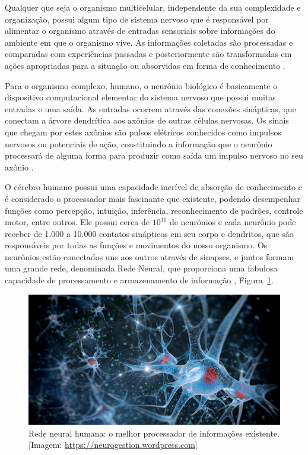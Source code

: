 Qualquer que seja o organismo multicelular, independente da sua complexidade e organização, possui algum tipo de sistema nervoso que é responsável por alimentar o organismo através de entradas sensoriais sobre informações do ambiente em que o organismo vive. As informações coletadas são processadas e comparadas com experiências passadas e posteriormente são transformadas em ações apropriadas para a situação ou absorvidas em forma de conhecimento \cite{haykin1994neural}.

Para o organismo complexo, humano, o neurônio biológico é basicamente o dispositivo computacional elementar do sistema nervoso que possui muitas entradas e uma saída. As entradas ocorrem através das conexões sinápticas, que conectam a árvore dendrítica aos axônios de outras células nervosas. Os sinais que chegam por estes axônios são pulsos elétricos conhecidos como impulsos nervosos ou potenciais de ação, constituindo a informação que o neurônio processará de alguma forma para produzir como saída um impulso nervoso no seu axônio \cite{kovacs1996redes}. 

O cérebro humano possui uma capacidade incrível de absorção de conhecimento e é considerado o processador mais fascinante que existente, podendo desempenhar funções como percepção, intuição, inferência, reconhecimento de padrões, controle motor, entre outros. Ele possui cerca de $10^{11}$ de neurônios e cada neurônio pode receber de 1.000 a 10.000 contatos sinápticos em seu corpo e dendritos, que são responsáveis por todas as funções e movimentos do nosso organismo. Os neurônios estão conectados uns aos outros através de sinapses, e juntos formam uma grande rede, denominada Rede Neural, que proporciona uma fabulosa capacidade de processamento e armazenamento de informação \cite{kovacs1996redes}, Figura~\ref{figneuronios}. 

\begin{figure}[ht]
\centering
\includegraphics[width=1\textwidth]{figuras/axons.jpg}
\caption{Rede neural humana: o melhor processador de informações existente. [Imagem: \href{ https://neurogestion.wordpress.com}{ https://neurogestion.wordpress.com}]}
\label{figneuronios}
\end{figure}

